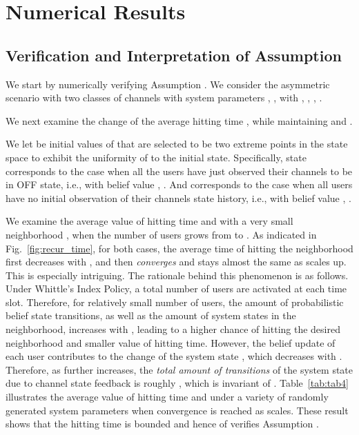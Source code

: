 \documentclass[11pt,twocolumn]{IEEEtran}
\begin{document}
\section{Numerical Results}

\subsection{Verification and Interpretation of Assumption }
\label{sec:num:just}

We start by numerically verifying Assumption . We consider
the asymmetric scenario with two classes of channels with system
parameters ,
, with , , , .

We next examine the change of the average hitting time , while maintaining  and .

We let  be initial values of  that are selected to be two extreme points in the state space to exhibit the uniformity of  to the initial state. Specifically, state  corresponds to the
case when all the users have just observed their channels to be in
OFF state, i.e., with belief value , . And 
corresponds to the case when all users have no initial observation
of their channels state history, i.e., with belief value ,
.

We examine the average value of hitting time  and  with a very small
neighborhood , when the number of users  grows from  to . As indicated in Fig.~\ref{fig:recur_time}, for both cases, the average time of hitting the  neighborhood first decreases with , and then \emph{converges} and stays almost the same as  scales up. This is especially
intriguing. The rationale behind this phenomenon is as follows. Under Whittle's Index Policy, a total number of  users are activated at each time slot. Therefore, for relatively small number of users, the amount of probabilistic belief state transitions, as well as the amount of system states in the neighborhood, increases with , leading to a higher chance of hitting the desired neighborhood
 and smaller value of hitting time. However, the belief update of each user
contributes to the  change of the system state , which
decreases with . Therefore, as  further increases, the \emph{total amount of transitions} of the system state  due to channel state feedback is roughly , which is invariant of . Table~\ref{tab:tab4} illustrates the average value of hitting time  and  under a variety of randomly generated system parameters when  convergence is reached as  scales. These result shows that the hitting time is bounded and hence of verifies Assumption .
\end{document}
